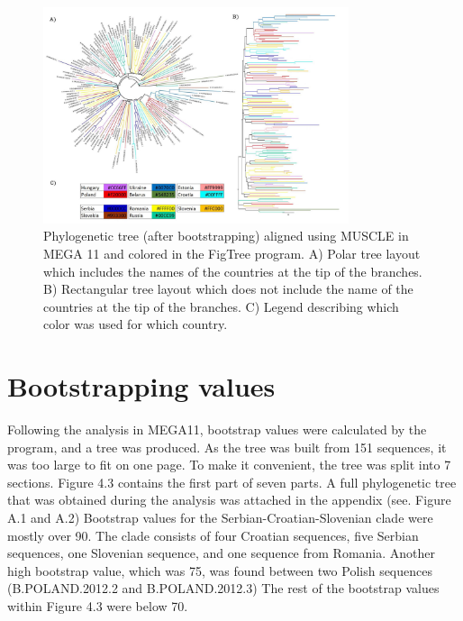 \begin{figure}[h]
  \centering
  \includegraphics[width=0.8\textwidth]{images/after bootstrapping all.jpeg}
  \caption{Phylogenetic tree (after bootstrapping) aligned using MUSCLE in MEGA 11 and colored in the FigTree program. A) Polar tree layout which includes the names of the countries at the tip of the branches. B) Rectangular tree layout which does not include the name of the countries at the tip of the branches. C) Legend describing which color was used for which country.}
  \label{fig: No bootstrapping trees.}
\end{figure}

\section{Bootstrapping values}
Following the analysis in MEGA11, bootstrap values were calculated by the program, and a tree was produced. 
As the tree was built from 151 sequences, it was too large to fit on one page. 
To make it convenient, the tree  was split into 7 sections.
Figure 4.3 contains the first part of seven parts. 
A full phylogenetic tree that was obtained during the analysis was attached in the appendix (see. Figure A.1 and A.2)
\clearpage
Bootstrap values for the Serbian-Croatian-Slovenian clade were mostly over 90. 
The clade consists of four Croatian sequences, five Serbian sequences, one Slovenian sequence, and one sequence from Romania. 
Another high bootstrap value, which was 75, was found between two Polish sequences (B.POLAND.2012.2 and B.POLAND.2012.3) 
The rest of the bootstrap values within Figure 4.3 were below 70.

